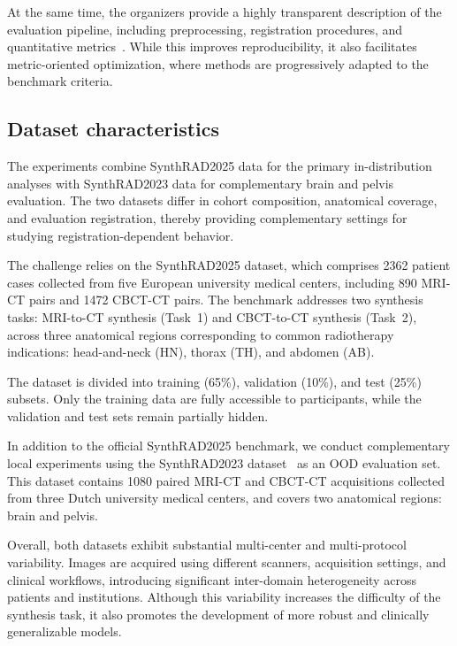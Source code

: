 \documentclass[lettersize,journal]{IEEEtran}
\begin{document}
At the same time, the organizers provide a highly transparent description of the evaluation pipeline, including preprocessing, registration procedures, and quantitative metrics~\cite{thummerer2025synthrad2025}. While this improves reproducibility, it also facilitates metric-oriented optimization, where methods are progressively adapted to the benchmark criteria.

\subsection{Dataset characteristics}

The experiments combine SynthRAD2025 data for the primary in-distribution analyses with SynthRAD2023 data for complementary brain and pelvis evaluation. The two datasets differ in cohort composition, anatomical coverage, and evaluation registration, thereby providing complementary settings for studying registration-dependent behavior.

The challenge relies on the SynthRAD2025 dataset, which comprises 2362 patient cases collected from five European university medical centers, including 890 MRI-CT pairs and 1472 CBCT-CT pairs. 
The benchmark addresses two synthesis tasks: MRI-to-CT synthesis (Task~1) and CBCT-to-CT synthesis (Task~2), across three anatomical regions corresponding to common radiotherapy indications: head-and-neck (HN), thorax (TH), and abdomen (AB).

The dataset is divided into training (65\%), validation (10\%), and test (25\%) subsets. 
Only the training data are fully accessible to participants, while the validation and test sets remain partially hidden.

In addition to the official SynthRAD2025 benchmark, we conduct complementary local experiments using the SynthRAD2023 dataset~\cite{huijben2024generating} as an OOD evaluation set. 
This dataset contains 1080 paired MRI-CT and CBCT-CT acquisitions collected from three Dutch university medical centers, and covers two anatomical regions: brain and pelvis.

Overall, both datasets exhibit substantial multi-center and multi-protocol variability. 
Images are acquired using different scanners, acquisition settings, and clinical workflows, introducing significant inter-domain heterogeneity across patients and institutions. 
Although this variability increases the difficulty of the synthesis task, it also promotes the development of more robust and clinically generalizable models.
\end{document}

